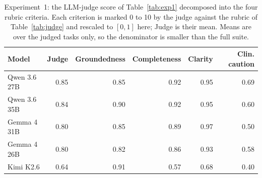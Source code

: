 \begin{table}[H]
\centering
\caption{Experiment~1: the LLM-judge score of Table~\ref{tab:exp1} decomposed into the four rubric criteria. Each criterion is marked 0 to 10 by the judge against the rubric of Table~\ref{tab:judge} and rescaled to $[0,1]$ here; Judge is their mean. Means are over the judged tasks only, so the denominator is smaller than the full suite.}
\label{tab:exp1_judge}
\small
\setlength{\tabcolsep}{5pt}
\begin{tabular}{@{}l rrrrr@{}}
\toprule
Model & Judge & Groundedness & Completeness & Clarity & Clin. caution \\
\midrule
Qwen 3.6 27B & 0.85 & 0.85 & 0.92 & 0.95 & 0.69 \\
Qwen 3.6 35B & 0.84 & 0.90 & 0.92 & 0.95 & 0.60 \\
Gemma 4 31B & 0.80 & 0.85 & 0.89 & 0.97 & 0.50 \\
Gemma 4 26B & 0.80 & 0.82 & 0.86 & 0.93 & 0.58 \\
Kimi K2.6 & 0.64 & 0.91 & 0.57 & 0.68 & 0.40 \\
\bottomrule
\end{tabular}
\end{table}
